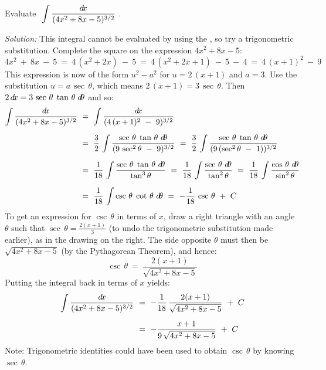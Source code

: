 \begin{exmp}\label{exmp:trigsub3}
\noindent Evaluate $~\displaystyle\int \frac{d\!x}{(4x^2 + 8x - 5)^{3/2}}~$.\vspace{1mm}
\par\noindent\emph{Solution:} This integral cannot be evaluated by using the
, so try a trigonometric substitution. Complete the square on the
expression $4x^2 + 8x - 5$:
\[
4x^2 ~+~ 8x ~-~ 5 ~=~ 4\,(x^2 + 2x) ~-~ 5
~=~ 4\,(x^2 + 2x + 1) ~-~ 5 ~-~ 4
~=~ 4\,(x + 1)^2 ~-~ 9
\]
This expression is now of the form $u^2 - a^2$ for $u=2\,(x+1)$ and $a=3$. Use
the substitution $u=a\,\sec\,\theta$, which means $2\,(x+1) = 3\,\sec\,\theta$.
Then $2\,d\!x = 3\,\sec\,\theta\;\tan\,\theta\;d\!\theta$ and so:
\begin{align*}
\int \frac{\dx}{(4x^2 + 8x - 5)^{3/2}} ~&=~ \int \frac{\dx}{(4\,(x + 1)^2 ~-~ 9)^{3/2}}\\[6pt]
&=~ \frac{3}{2}\,\int \frac{\sec\,\theta\;\tan\,\theta~\dtheta}{(9\,\sec^2 \theta ~-~ 9)^{3/2}}
~=~ \frac{3}{2}\,\int \frac{\sec\,\theta\;\tan\,\theta~\dtheta}{(9\,(\sec^2 \theta ~-~ 1))^{3/2}}\\[6pt]
&=~ \frac{1}{18}\,\int \frac{\sec\,\theta\;\tan\,\theta~\dtheta}{\tan^3 \theta}
~=~ \frac{1}{18}\,\int \frac{\sec\,\theta~\dtheta}{\tan^2 \theta}
~=~ \frac{1}{18}\,\int \frac{\cos\,\theta~\dtheta}{\sin^2 \theta}\\[6pt]
&=~ \frac{1}{18}\,\int \csc\,\theta\;\cot\,\theta~\dtheta
~=~ -\frac{1}{18}\,\csc\,\theta ~+~ C
\end{align*}
\noindent To get an expression for $\csc\,\theta$ in terms of $x$, draw a right
triangle with an angle $\theta$ such that $\sec\,\theta = \frac{2(x+1)}{3}$ (to undo the trigonometric substitution made earlier), as
in the drawing on the right. The side opposite $\theta$ must then be
$\sqrt{4x^2 + 8x - 5}$ (by the Pythagorean Theorem), and hence:
\[
\csc\,\theta ~=~ \frac{2(x+1)}{\sqrt{4x^2 + 8x - 5}}
\]
Putting the integral back in terms of $x$ yields:
\begin{align*}
\int \frac{d\!x}{(4x^2 + 8x - 5)^{3/2}} ~&=~
 -\frac{1}{18}\,\frac{2(x+1)}{\sqrt{4x^2 + 8x - 5}} ~+~ C\\[6pt]
&=~ -\frac{x+1}{9\,\sqrt{4x^2 + 8x - 5}} ~+~ C
\end{align*}
Note: Trigonometric identities could have been used to obtain $\csc\,\theta$ by
knowing $\sec\,\theta$.
\end{exmp}\vspace{-2mm}
\divider
\vspace{2mm}

